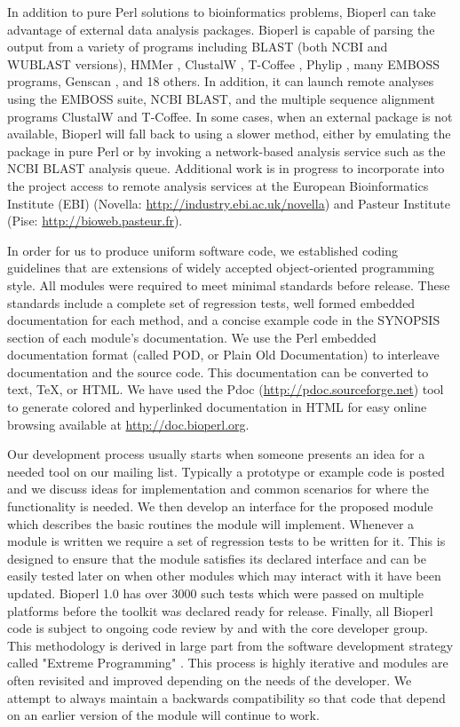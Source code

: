 \documentclass[12pt]{article}
\begin{document}
In addition to pure Perl solutions to bioinformatics problems, Bioperl
can take advantage of external data analysis packages.  Bioperl is
capable of parsing the output from a variety of programs including
BLAST (both NCBI and WUBLAST \cite{wublast} versions), HMMer
\cite{hmmer}, ClustalW \cite{clustalw}, T-Coffee \cite{tcoffee},
Phylip \cite{phylip}, many EMBOSS \cite{emboss} programs, Genscan
\cite{genscan}, and 18 others.  In addition, it can launch remote
analyses using the EMBOSS suite, NCBI BLAST, and the multiple sequence
alignment programs ClustalW and T-Coffee.  In some cases, when an
external package is not available, Bioperl will fall back to using a
slower method, either by emulating the package in pure Perl or by
invoking a network-based analysis service such as the NCBI BLAST
analysis queue.  Additional work is in progress to incorporate into
the project access to remote analysis services at the European
Bioinformatics Institute (EBI)
(Novella: \url{http://industry.ebi.ac.uk/novella}) and Pasteur Institute
(Pise: \url{http://bioweb.pasteur.fr}).

In order for us to produce uniform software code, we established
coding guidelines that are extensions of widely accepted
object-oriented programming style.  All modules were required to meet
minimal standards before release.  These standards include a complete
set of regression tests, well formed embedded documentation for each
method, and a concise example code in the SYNOPSIS section of each
module's documentation.  We use the Perl embedded documentation format
(called POD, or Plain Old Documentation) to interleave documentation and
the source code.  This documentation can be converted to text, TeX, or
HTML.  We have used the Pdoc (\url{http://pdoc.sourceforge.net}) tool to
generate colored and hyperlinked documentation in HTML for easy
online browsing available at \url{http://doc.bioperl.org}.

Our development process usually starts when someone presents an idea
for a needed tool on our mailing list.  Typically a prototype or
example code is posted and we discuss ideas for implementation and
common scenarios for where the functionality is needed.  We then
develop an interface for the proposed module which describes the basic
routines the module will implement.  Whenever a module is written we
require a set of regression tests to be written for it.  This is
designed to ensure that the module satisfies its declared interface
and can be easily tested later on when other modules which may
interact with it have been updated.  Bioperl 1.0 has over 3000 such
tests which were passed on multiple platforms before the toolkit was
declared ready for release.  Finally, all Bioperl code is subject to
ongoing code review by and with the core developer group.  This
methodology is derived in large part from the software development
strategy called "Extreme Programming" \cite{xprogramming}.  This
process is highly iterative and modules are often revisited and improved
depending on the needs of the developer.  We attempt to always
maintain a backwards compatibility so that code that depend on an
earlier version of the module will continue to work.    
\end{document}
